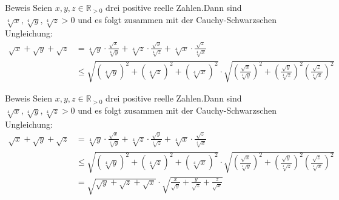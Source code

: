 \documentclass[10pt]{beamer}
\def\bR{\mathbb{R}}
\begin{document}
\begin{frame}{Beweis}
    Seien \( x, y, z \in \bR_{> 0} \) drei positive reelle Zahlen.Dann sind \( \sqrt[4]{x}, \sqrt[4]{y}, \sqrt[4]{z} > 0 \) und es folgt zusammen mit der Cauchy-Schwarzschen Ungleichung:
    \begin{align*}
        \sqrt{x} + \sqrt{y} + \sqrt{z}
        & = \sqrt[4]{y} \cdot \frac{\sqrt{x}}{\sqrt[4]{y}} + \sqrt[4]{z} \cdot \frac{\sqrt{y}}{\sqrt[4]{z}} + \sqrt[4]{x} \cdot \frac{\sqrt{z}}{\sqrt[4]{x}} \\
        & \leq \sqrt{\left( \sqrt[4]{y} \right)^{2} + \left( \sqrt[4]{z} \right)^{2} + \left( \sqrt[4]{x} \right)^{2}} \cdot \sqrt{\left( \frac{\sqrt{x}}{\sqrt[4]{y}} \right)^{2} + \left( \frac{\sqrt{y}}{\sqrt[4]{z}} \right)^{2} \left( \frac{\sqrt{z}}{\sqrt[4]{x}} \right)^{2}}
    \end{align*}
\end{frame}



\begin{frame}{Beweis}
    Seien \( x, y, z \in \bR_{> 0} \) drei positive reelle Zahlen.Dann sind \( \sqrt[4]{x}, \sqrt[4]{y}, \sqrt[4]{z} > 0 \) und es folgt zusammen mit der Cauchy-Schwarzschen Ungleichung:
    \begin{align*}
        \sqrt{x} + \sqrt{y} + \sqrt{z}
        & = \sqrt[4]{y} \cdot \frac{\sqrt{x}}{\sqrt[4]{y}} + \sqrt[4]{z} \cdot \frac{\sqrt{y}}{\sqrt[4]{z}} + \sqrt[4]{x} \cdot \frac{\sqrt{z}}{\sqrt[4]{x}} \\
        & \leq \sqrt{\left( \sqrt[4]{y} \right)^{2} + \left( \sqrt[4]{z} \right)^{2} + \left( \sqrt[4]{x} \right)^{2}} \cdot \sqrt{\left( \frac{\sqrt{x}}{\sqrt[4]{y}} \right)^{2} + \left( \frac{\sqrt{y}}{\sqrt[4]{z}} \right)^{2} \left( \frac{\sqrt{z}}{\sqrt[4]{x}} \right)^{2}} \\
        & = \sqrt{\sqrt{y} + \sqrt{z} + \sqrt{x}} \cdot \sqrt{\frac{x}{\sqrt{y}} + \frac{y}{\sqrt{z}} + \frac{z}{\sqrt{x}}}
    \end{align*}
\end{frame}
\end{document}
